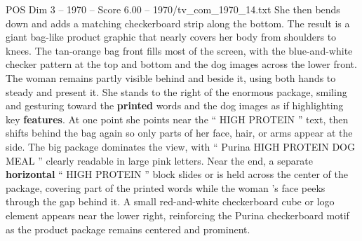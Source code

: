 \begin{textsample}{POS Dim 3 – 1970 – Score 6.00 – 1970/tv\_com\_1970\_14.txt}
She then bends down and adds a matching checkerboard strip along the bottom.
The result is a giant bag-like product graphic that nearly covers her body from shoulders to knees.
The tan-orange bag front fills most of the screen, with the blue-and-white checker pattern at the top and bottom and the dog images across the lower front.
The woman remains partly visible behind and beside it, using both hands to steady and present it.
She stands to the right of the enormous package, smiling and gesturing toward the \textbf{printed} words and the dog images as if highlighting key \textbf{features}.
At one point she points near the “ HIGH PROTEIN ” text, then shifts behind the bag again so only parts of her face, hair, or arms appear at the side.
The big package dominates the view, with “ Purina HIGH PROTEIN DOG MEAL ” clearly readable in large pink letters.
Near the end, a separate \textbf{horizontal} “ HIGH PROTEIN ” block slides or is held across the center of the package, covering part of the printed words while the woman ’s face peeks through the gap behind it.
A small red-and-white checkerboard cube or logo element appears near the lower right, reinforcing the Purina checkerboard motif as the product package remains centered and prominent.

\end{textsample}
